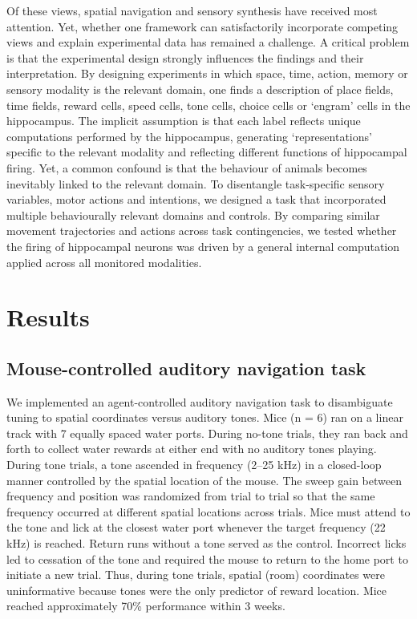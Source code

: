 Of these views, spatial navigation and sensory synthesis have received most attention. Yet, whether one framework can satisfactorily incorporate competing views and explain experimental data has remained a challenge. A critical problem is that the experimental design strongly influences the findings and their interpretation. By designing experiments in which space, time, action, memory or sensory modality is the relevant domain, one finds a description of place fields, time fields, reward cells, speed cells, tone cells, choice cells or `engram' cells in the hippocampus. The implicit assumption is that each label reflects unique computations performed by the hippocampus, generating `representations' specific to the relevant modality and reflecting different functions of hippocampal firing. Yet, a common confound is that the behaviour of animals becomes inevitably linked to the relevant domain. To disentangle task-specific sensory variables, motor actions and intentions, we designed a task that incorporated multiple behaviourally relevant domains and controls. By comparing similar movement trajectories and actions across task contingencies, we tested whether the firing of hippocampal neurons was driven by a general internal computation applied across all monitored modalities.

\section{Results}

\subsection{Mouse-controlled auditory navigation task}

We implemented an agent-controlled auditory navigation task to disambiguate tuning to spatial coordinates versus auditory tones. Mice (n = 6) ran on a linear track with 7 equally spaced water ports. During no-tone trials, they ran back and forth to collect water rewards at either end with no auditory tones playing. During tone trials, a tone ascended in frequency (2--25 kHz) in a closed-loop manner controlled by the spatial location of the mouse. The sweep gain between frequency and position was randomized from trial to trial so that the same frequency occurred at different spatial locations across trials. Mice must attend to the tone and lick at the closest water port whenever the target frequency (22 kHz) is reached. Return runs without a tone served as the control. Incorrect licks led to cessation of the tone and required the mouse to return to the home port to initiate a new trial. Thus, during tone trials, spatial (room) coordinates were uninformative because tones were the only predictor of reward location. Mice reached approximately 70\% performance within 3 weeks.

